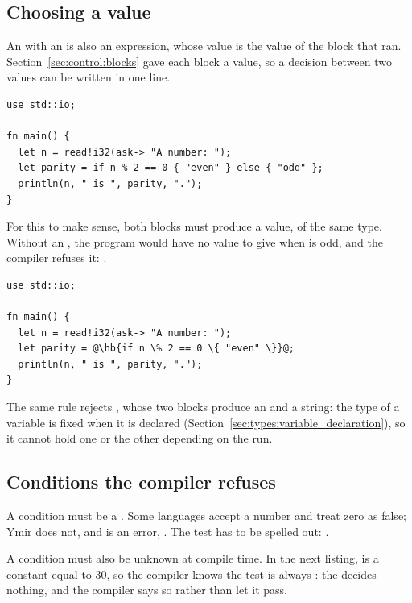 \subsection{Choosing a value}

An  with an  is also an expression, whose value is the
value of the block that ran. Section~\ref{sec:control:blocks} gave each block a
value, so a decision between two values can be written in one line.

\begin{lstlisting}[style=coloredverbatim, caption=An \token{if} used as a value, label=lst:control:if_value]
use std::io;

fn main() {
  let n = read!i32(ask-> "A number: ");
  let parity = if n % 2 == 0 { "even" } else { "odd" };
  println(n, " is ", parity, ".");
}
\end{lstlisting}

For this to make sense, both blocks must produce a value, of the same type.
Without an , the program would have no value to give
 when  is odd, and the compiler refuses it:
.

\begin{lstlisting}[style=coloredverbatimError, escapechar=@, caption=An \token{if} with no \token{else} has no value]
use std::io;

fn main() {
  let n = read!i32(ask-> "A number: ");
  let parity = @\hb{if n \% 2 == 0 \{ "even" \}}@;
  println(n, " is ", parity, ".");
}
\end{lstlisting}

The same rule rejects , whose two
blocks produce an  and a string: the type of a variable is fixed when
it is declared (Section~\ref{sec:types:variable_declaration}), so it cannot hold
one or the other depending on the run.

\subsection{Conditions the compiler refuses}

A condition must be a . Some languages accept a number and treat
zero as false; Ymir does not, and  is an error,
. The test has to be spelled out: .

A condition must also be unknown at compile time. In the next listing,
 is a constant equal to 30, so the compiler knows the test is
always : the  decides nothing, and the compiler says so
rather than let it pass.

